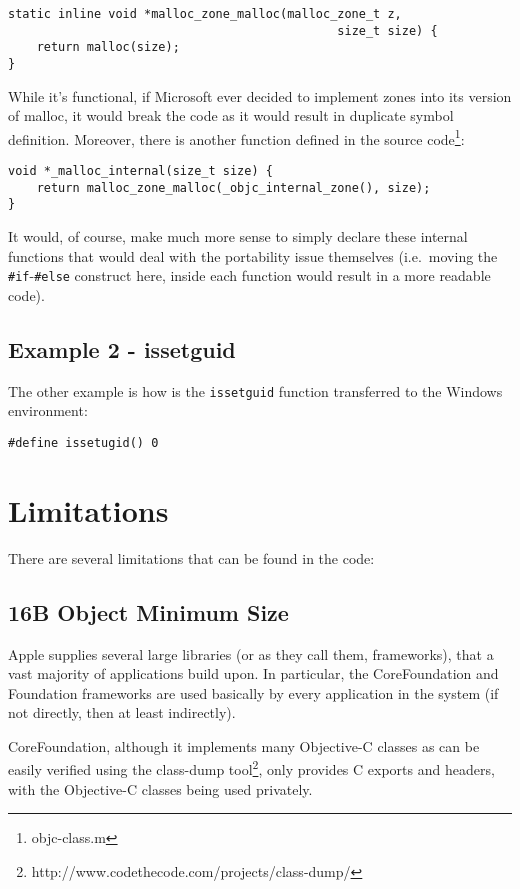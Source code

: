 \begin{verbatim}
static inline void *malloc_zone_malloc(malloc_zone_t z, 
                                              size_t size) { 
    return malloc(size); 
}
\end{verbatim}

While it's functional, if Microsoft ever decided to implement zones into its version of malloc, it would break the code as it would result in duplicate symbol definition. Moreover, there is another function defined in the source code\footnote{objc-class.m}:

\begin{verbatim}
void *_malloc_internal(size_t size) {
    return malloc_zone_malloc(_objc_internal_zone(), size);
}
\end{verbatim}

It would, of course, make much more sense to simply declare these internal functions that would deal with the portability issue themselves (i.e.\ moving the \verb=#if=-\verb=#else= construct here, inside each function would result in a more readable code).

\subsection{Example 2 - issetguid}
The other example is how is the \verb=issetguid= function transferred to the Windows environment:

\begin{verbatim}
#define issetugid() 0
\end{verbatim}

\section{Limitations}
There are several limitations that can be found in the code:

\subsection{16B Object Minimum Size}
Apple supplies several large libraries (or as they call them, frameworks), that a vast majority of applications build upon. In particular, the CoreFoundation and Foundation frameworks are used basically by every application in the system (if not directly, then at least indirectly).

CoreFoundation, although it implements many Objective-C classes as can be easily verified using the class-dump tool\footnote{http://www.codethecode.com/projects/class-dump/}, only provides C exports and headers, with the Objective-C classes being used privately.

